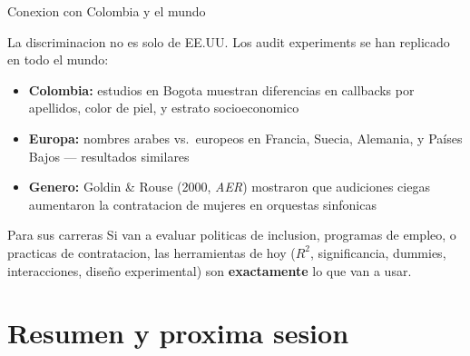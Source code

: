 \documentclass[aspectratio=169, 11pt]{beamer}
\begin{document}
\begin{frame}{Conexion con Colombia y el mundo}
\small
\begin{block}{La discriminacion no es solo de EE.UU.}
Los audit experiments se han replicado en todo el mundo:
\begin{itemize}\setlength{\itemsep}{2pt}
  \item \textbf{Colombia:} estudios en Bogota muestran diferencias en callbacks por apellidos, color de piel, y estrato socioeconomico
  \item \textbf{Europa:} nombres arabes vs.\ europeos en Francia, Suecia, Alemania, y Pa\'ises Bajos --- resultados similares
  \item \textbf{Genero:} Goldin \& Rouse (2000, \textit{AER}) mostraron que audiciones ciegas aumentaron la contratacion de mujeres en orquestas sinfonicas
\end{itemize}
\end{block}

\vspace{0.2cm}
\begin{alertblock}{Para sus carreras}
\small Si van a evaluar politicas de inclusion, programas de empleo, o practicas de contratacion, las herramientas de hoy ($R^2$, significancia, dummies, interacciones, dise\~no experimental) son \textbf{exactamente} lo que van a usar.
\end{alertblock}
\end{frame}

\section{Resumen y proxima sesion}
\end{document}

